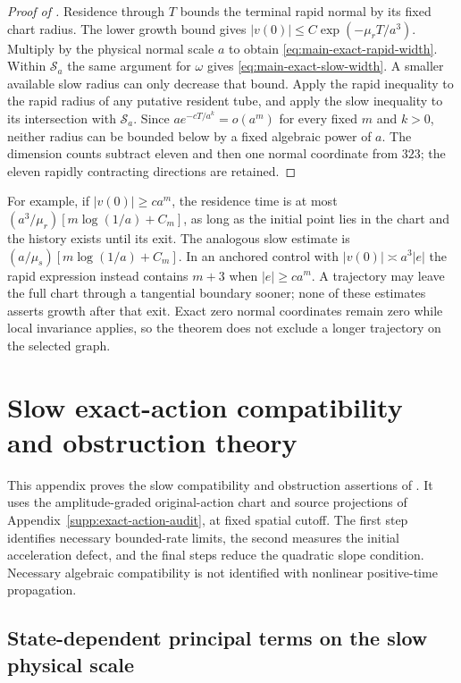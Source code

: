 \documentclass[11pt]{article}
\numberwithin{equation}{section}
\theoremstyle{definition}
\theoremstyle{remark}
\begin{document}
\begin{proof}[Proof of ]
Residence through $T$ bounds the terminal rapid normal by its fixed chart
radius. The lower growth bound gives
$|v(0)|\le C\exp(-\mu_rT/a^3)$. Multiply by the physical normal scale
$a$ to obtain \eqref{eq:main-exact-rapid-width}. Within $\mathcal S_a$ the
same argument for $\omega$ gives \eqref{eq:main-exact-slow-width}.
A smaller available slow radius can only decrease that bound. Apply the
rapid inequality to the rapid radius of any putative resident tube, and
apply the slow inequality to its intersection with $\mathcal S_a$.
Since $ae^{-cT/a^k}=o(a^m)$ for every fixed $m$ and $k>0$, neither radius
can be bounded below by a fixed algebraic power of $a$.
The dimension counts subtract eleven and then one normal coordinate from
$323$; the eleven rapidly contracting directions are retained.
\end{proof}

For example, if $|v(0)|\ge c a^m$, the residence time is at most
$(a^3/\mu_r)[m\log(1/a)+C_m]$, as long as the initial point lies in the
chart and the history exists until its exit. The analogous slow estimate is
$(a/\mu_s)[m\log(1/a)+C_m]$. In an anchored control with
$|v(0)|\asymp a^3|e|$ the rapid expression instead contains $m+3$ when
$|e|\ge ca^m$. A trajectory may leave the full chart through a tangential
boundary sooner; none of these estimates asserts growth after that exit.
Exact zero normal coordinates remain zero while local invariance applies,
so the theorem does not exclude a longer trajectory on the selected graph.


\section{Slow exact-action compatibility and obstruction theory}
\label{supp:exact-action-slow}

This appendix proves the slow compatibility and obstruction assertions of
. It uses the amplitude-graded
original-action chart and source projections of
Appendix~\ref{supp:exact-action-audit}, at fixed spatial cutoff.
The first step identifies necessary bounded-rate limits, the second
measures the initial acceleration defect, and the final steps reduce the
quadratic slope condition. Necessary algebraic compatibility is not
identified with nonlinear positive-time propagation.
\subsection{State-dependent principal terms on the slow physical scale}
\label{subsec:supp-exact-slow}
\end{document}
